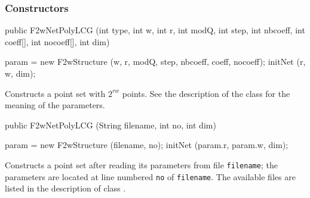 \subsubsection*{Constructors}
\begin{code}

   public F2wNetPolyLCG (int type, int w, int r, int modQ, int step,
                         int nbcoeff, int coeff[], int nocoeff[], int dim) \begin{hide} 
   {
      param = new F2wStructure (w, r, modQ, step, nbcoeff, coeff, nocoeff);
      initNet (r, w, dim);
   }
\end{hide}
\end{code}
 \begin{tabb}
Constructs a point set with $2^{rw}$ points.  See the description of the class
 for the meaning of the 
 parameters.
 \end{tabb}
\begin{code}

   public F2wNetPolyLCG (String filename, int no, int dim) \begin{hide} 
   {
      param = new F2wStructure (filename, no);
      initNet (param.r, param.w, dim);
   }\end{hide}
\end{code}
 \begin{tabb}
   Constructs a point set after reading its parameters from
   file \texttt{filename}; the parameters are located at line numbered \texttt{no}
   of \texttt{filename}. The available files are listed in the description of class
.
 \end{tabb}
\begin{code}
\begin{hide} 

   public String toString ()
   {
       String s = "F2wNetPolyLCG:" + PrintfFormat.NEWLINE;
       return s + param.toString ();
   }


   private void initNet (int r, int w, int dim)
   {
      normFactor = param.normFactor;
   }
}
\end{hide}
\end{code}
